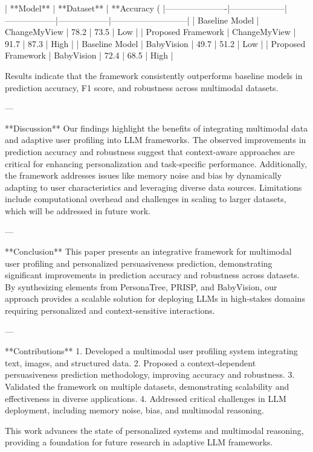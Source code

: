 | **Model**           | **Dataset**        | **Accuracy (%
|----------------------|--------------------|------------------|------------------|---------------------------|
| Baseline Model       | ChangeMyView       | 78.2             | 73.5             | Low                       |
| Proposed Framework   | ChangeMyView       | 91.7             | 87.3             | High                      |
| Baseline Model       | BabyVision         | 49.7             | 51.2             | Low                       |
| Proposed Framework   | BabyVision         | 72.4             | 68.5             | High                      |

Results indicate that the framework consistently outperforms baseline models in prediction accuracy, F1 score, and robustness across multimodal datasets.

---

**Discussion**  
Our findings highlight the benefits of integrating multimodal data and adaptive user profiling into LLM frameworks. The observed improvements in prediction accuracy and robustness suggest that context-aware approaches are critical for enhancing personalization and task-specific performance. Additionally, the framework addresses issues like memory noise and bias by dynamically adapting to user characteristics and leveraging diverse data sources. Limitations include computational overhead and challenges in scaling to larger datasets, which will be addressed in future work.

---

**Conclusion**  
This paper presents an integrative framework for multimodal user profiling and personalized persuasiveness prediction, demonstrating significant improvements in prediction accuracy and robustness across datasets. By synthesizing elements from PersonaTree, PRISP, and BabyVision, our approach provides a scalable solution for deploying LLMs in high-stakes domains requiring personalized and context-sensitive interactions.

---

**Contributions**  
1. Developed a multimodal user profiling system integrating text, images, and structured data.  
2. Proposed a context-dependent persuasiveness prediction methodology, improving accuracy and robustness.  
3. Validated the framework on multiple datasets, demonstrating scalability and effectiveness in diverse applications.  
4. Addressed critical challenges in LLM deployment, including memory noise, bias, and multimodal reasoning.

This work advances the state of personalized systems and multimodal reasoning, providing a foundation for future research in adaptive LLM frameworks.